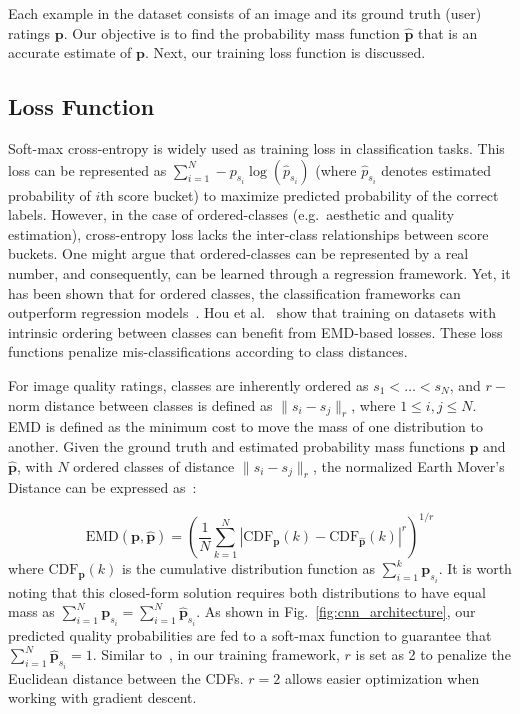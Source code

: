 \documentclass[10pt,twocolumn,twoside]{IEEEtran}
\begin{document}
Each example in the dataset consists of an image and its ground truth (user) ratings $\textbf{p}$. Our objective is to find the probability mass function $\widehat{\textbf{p}}$ that is an accurate estimate of $\textbf{p}$. Next, our training loss function is discussed.

\subsection{Loss Function}
Soft-max cross-entropy is widely used as training loss in classification tasks. This loss can be represented as $\sum_{i=1}^{N} -p_{s_i} \log(\widehat{p}_{s_i})$ (where $\widehat{p}_{s_i}$ denotes estimated probability of $i$th score bucket) to maximize predicted probability of the correct labels. However, in the case of ordered-classes (e.g.\ aesthetic and quality estimation), cross-entropy loss lacks the inter-class relationships between score buckets. One might argue that ordered-classes can be represented by a real number, and consequently, can be learned through a regression framework. Yet, it has been shown that for ordered classes, the classification frameworks can outperform regression models~\cite{hou2016squared, golik2013cross}. Hou et al.~\cite{hou2016squared} show that training on datasets with intrinsic ordering between classes can benefit from EMD-based losses. These loss functions penalize mis-classifications according to class distances.

For image quality ratings, classes are inherently ordered as $s_1 < \dots  < s_N$, and $r-$norm distance between classes is defined as $\|s_i - s_j\|_r$, where $1 \leq i, j \leq N$. EMD is defined as the minimum cost to move the mass of one distribution to another. Given the ground truth and estimated probability mass functions $\textbf{p}$ and $\widehat{\textbf{p}}$, with $N$ ordered classes of distance $\|s_i - s_j\|_r$, the normalized Earth Mover's Distance can be expressed as~\cite{levina2001earth}:

\begin{equation}
\label{eqn:emd}
\mbox{EMD}(\textbf{p}, \widehat{\textbf{p}}) = \left( \frac{1}{N} \sum_{k=1}^{N} |\mbox{CDF}_{\textbf{p}}(k) - \mbox{CDF}_{\widehat{\textbf{p}}}(k)|^r \right)^{1/r}
\end{equation}
where $\mbox{CDF}_{\textbf{p}}(k)$ is the cumulative distribution function as $\sum_{i=1}^{k} \textbf{p}_{s_i}$. It is worth noting that this closed-form solution requires both distributions to have equal mass as $\sum_{i=1}^{N} \textbf{p}_{s_i} = \sum_{i=1}^{N} \widehat{\textbf{p}}_{s_i}$. As shown in Fig.~\ref{fig:cnn_architecture}, our predicted quality probabilities are fed to a soft-max function to guarantee that $\sum_{i=1}^{N} \widehat{\textbf{p}}_{s_i} = 1$. Similar to~\cite{hou2016squared}, in our training framework, $r$ is set as 2 to penalize the Euclidean distance between the CDFs. $r=2$ allows easier optimization when working with gradient descent.
 
\end{document}
